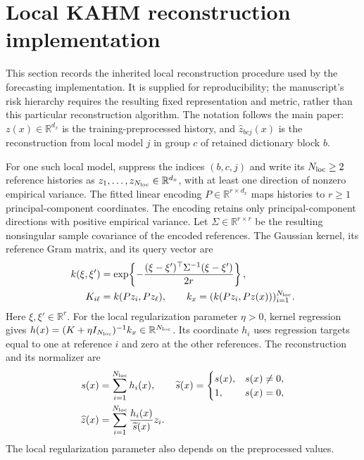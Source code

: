 \section{Local KAHM reconstruction implementation}
\label{supp:kahm-implementation}

This section records the inherited local reconstruction procedure used by the
forecasting implementation. It is supplied for reproducibility; the manuscript's
risk hierarchy requires the resulting fixed representation and metric, rather
than this particular reconstruction algorithm. The notation follows the main
paper: $z(x)\in\mathbb R^{d_x}$ is the training-preprocessed history, and
$\widehat z_{bcj}(x)$ is the reconstruction from local model $j$ in group $c$
of retained dictionary block $b$.

For one such local model, suppress the indices $(b,c,j)$ and write its
$N_{\rm loc}\geq2$ reference histories as
$z_1,\ldots,z_{N_{\rm loc}}\in\mathbb R^{d_x}$, with at least one direction of
nonzero empirical variance. The fitted linear encoding
$P\in\mathbb R^{r\times d_x}$ maps histories to
$r\geq1$ principal-component coordinates. The encoding retains only principal-component directions with positive empirical
variance. Let $\Sigma\in\mathbb R^{r\times r}$ be the resulting nonsingular
sample covariance of the encoded references. The Gaussian
kernel, its reference Gram matrix, and its query vector are
\begin{align*}
 k(\xi,\xi')&=\exp\!\left\{-\frac{(\xi-\xi')^\top\Sigma^{-1}
                                  (\xi-\xi')}{2r}\right\},\\
 K_{i\ell}&=k(Pz_i,Pz_\ell),\qquad
 k_x=(k(Pz_i,Pz(x)))_{i=1}^{N_{\rm loc}}.
\end{align*}
Here $\xi,\xi'\in\mathbb R^r$. For the local regularization parameter
$\eta>0$, kernel regression gives
$h(x)=(K+\eta I_{N_{\rm loc}})^{-1}k_x\in\mathbb R^{N_{\rm loc}}$.
Its coordinate $h_i$ uses regression targets equal to one at reference $i$
and zero at the other references. The reconstruction and its normalizer are
\begin{align*}
 s(x)&=\sum_{i=1}^{N_{\rm loc}}h_i(x),\qquad
 \widetilde s(x)=
 \begin{cases}s(x),&s(x)\ne0,\\1,&s(x)=0,\end{cases}\\
 \widehat z(x)&=\sum_{i=1}^{N_{\rm loc}}
                   \frac{h_i(x)}{\widetilde s(x)}z_i.
\end{align*}
The local regularization parameter also depends on the preprocessed values.
